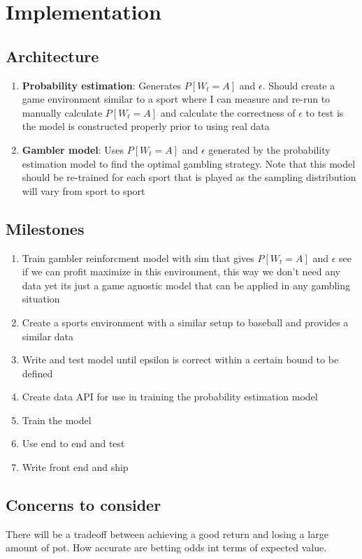 \documentclass{article}
\begin{document}
    
\section*{Implementation}
    \subsection*{Architecture}

        \begin{enumerate}
            \item \textbf{Probability estimation}: Generates $P[W_t = A]$ and $\epsilon$. Should create a game environment similar to a sport where I can measure and re-run to manually calculate $P[W_t = A]$ and calculate the correctness of $\epsilon$ to test is the model is constructed properly prior to using real data
            \item \textbf{Gambler model}: Uses $P[W_t = A]$ and $\epsilon$ generated by the probability estimation model to find the optimal gambling strategy. Note that this model should be re-trained for each sport that is played as the sampling distribution will vary from sport to sport
        \end{enumerate}
    
    \subsection*{Milestones}
    
        \begin{enumerate}
            \item Train gambler reinforcment model with sim that gives $P[W_t = A]$ and $\epsilon$ see if we can profit maximize in this environment, this way we don't need any data yet its just a game agnostic model that can be applied in any gambling situation
            \item Create a sports environment with a similar setup to baseball and provides a similar data
            \item Write and test model until epsilon is correct within a certain bound to be defined
            \item Create data API for use in training the probability estimation model
            \item Train the model
            \item Use end to end and test
            \item Write front end and ship
        \end{enumerate}

    \subsection*{Concerns to consider}
        There will be a tradeoff between achieving a good return and losing a large amount of pot.
        How accurate are betting odds int terms of expected value.
\end{document}
